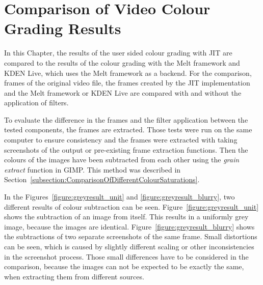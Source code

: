 \documentclass[../MasterThesis.tex]{subfiles}
\begin{document}
	
	
%
%
%
%
%
%
%
%
\newpage
\section{Comparison of Video Colour Grading Results} \label{section:experimentalevaluationanddiscussion}  


In this Chapter, the results of the user sided colour grading with JIT are compared to the results of the colour grading with the Melt framework and KDEN Live, which uses the Melt framework as a backend. For the comparison, frames of the original video file, the frames created by the JIT implementation and the Melt framework or KDEN Live are compared with and without the application of filters.


To evaluate the difference in the frames and the filter application between the tested components, the frames are extracted. Those tests were run on the same computer to ensure consistency and the frames were extracted with taking screenshots of the output or pre-existing frame extraction functions.
Then the colours of the images have been subtracted from each other using the \textit{grain extract} function in GIMP. 
This method was described in Section~\ref{subsection:ComparisonOfDifferentColourSaturations}.


In the Figures~\ref{figure:greyresult_unit} and \ref{figure:greyresult_blurry}, two different results of colour subtraction can be seen. Figure~\ref{figure:greyresult_unit} shows the subtraction of an image from itself. This results in a uniformly grey image, because the images are identical. Figure~\ref{figure:greyresult_blurry} shows the subtractions of two separate screenshots of the same frame. Small distortions can be seen, which is caused by slightly different scaling or other inconsistencies in the screenshot process. Those small differences have to be considered in the comparison, because the images can not be expected to be exactly the same, when extracting them from different sources.
\end{document}
